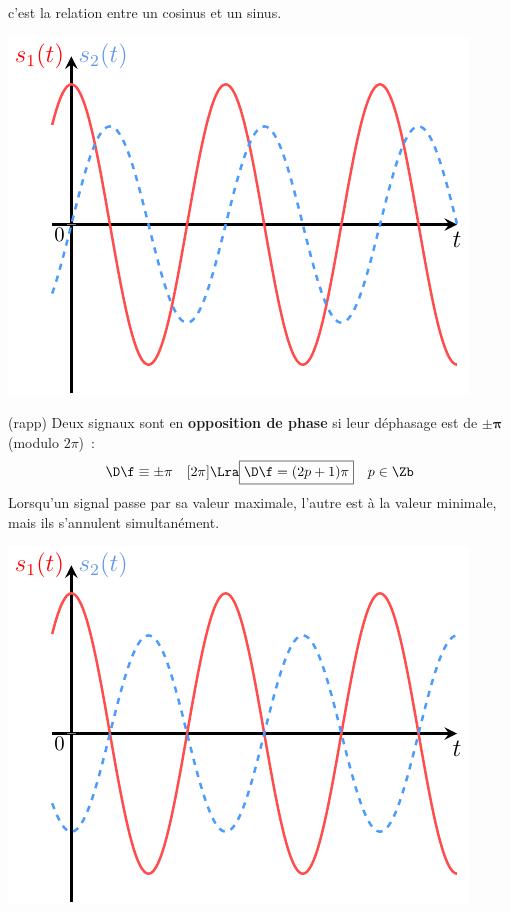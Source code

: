 \documentclass[../../main/main.tex]{subfiles}
\begin{document}
\begin{tcb}[breakable]
\begin{isd}[righthand ratio=.3, interior hidden]
		c'est la relation entre un cosinus et un sinus.
		\tcblower
		\begin{center}
			\includegraphics[width=\linewidth]{dfeqpi2.pdf}
			\captionsetup{justification=centering}
		\end{center}
	\end{isd}
	\vspace{-15pt}
	\begin{isd}[righthand ratio=.3, interior hidden](rapp)
		Deux signaux sont en \textbf{opposition de phase} si leur déphasage est de
		$\mathbf{\pm\pi}$ (modulo $2\pi$)~:
		\[
			\D\f \equiv \pm\pi \quad[2\pi]
			\Lra
			\boxed{\D\f = (2p+1)\pi}
			\quad p \in \Zb
		\]
		Lorsqu'un signal passe par sa valeur maximale, l'autre est à la valeur
		minimale, mais ils s'annulent simultanément.
		\tcblower
		\begin{center}
			\includegraphics[width=\linewidth]{dfeqpi.pdf}

\end{center}
\end{isd}
\end{tcb}
\end{document}
